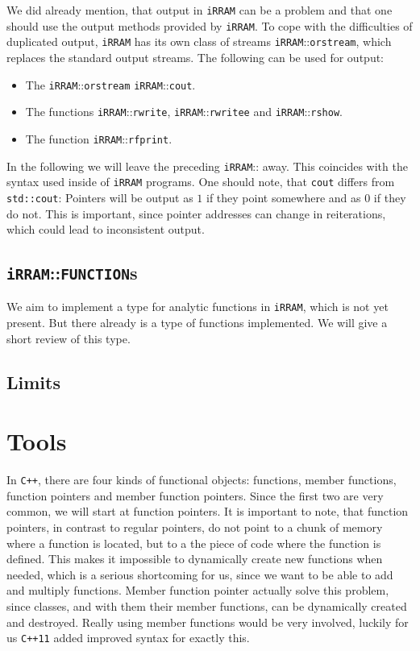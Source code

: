 \documentclass{article}
\newcommand{\irram}{\texttt{iRRAM}\xspace}
\newcommand{\cc}{\texttt{C++}\xspace}
\newcommand{\ccOx}{\texttt{C++11}\xspace}
\newcommand{\ir}[1]{\texttt{#1}}
\begin{document}
We did already mention, that output in \irram can be a problem and that one should use the output methods provided by \irram. To cope with the difficulties of duplicated output, \irram has its own class of streams \irram::\ir{orstream}, which replaces the standard output streams. The following can be used for output:
\begin{itemize}
\item The \irram::\ir{orstream} \irram::\ir{cout}.
\item The functions \irram::\ir{rwrite}, \irram::\ir{rwritee} and \irram::\ir{rshow}.
\item The function \irram::\ir{rfprint}.
\end{itemize}
In the following we will leave the preceding \irram:: away. This coincides with the syntax used inside of \irram programs. One should note, that \ir{cout} differs from \texttt{std::cout}: Pointers will be output as $1$ if they point somewhere and as $0$ if they do not. This is important, since pointer addresses can change in reiterations, which could lead to inconsistent output.

\subsection{\irram::\ir{FUNCTION}s}

We aim to implement a type for analytic functions in \irram, which is not yet present. But there already is a type of functions implemented. We will give a short review of this type.

\subsection{Limits}

\section{Tools}

In \cc, there are four kinds of functional objects: functions, member functions, function pointers and member function pointers. Since the first two are very common, we will start at function pointers. It is important to note, that function pointers, in contrast to regular pointers, do not point to a chunk of memory where a function is located, but to a the piece of code where the function is defined. This makes it impossible to dynamically create new functions when needed, which is a serious shortcoming for us, since we want to be able to add and multiply functions. Member function pointer actually solve this problem, since classes, and with them their member functions, can be dynamically created and destroyed. Really using member functions would be very involved, luckily for us \ccOx added improved syntax for exactly this.
\end{document}
